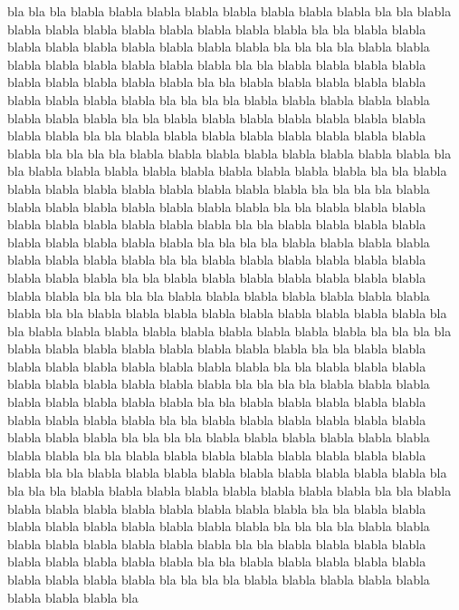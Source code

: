 \documentclass[12pt,a4paper,english]{book}
\begin{document}
bla bla
bla blabla blabla blabla blabla blabla blabla blabla blabla bla
bla blabla blabla blabla blabla blabla blabla blabla blabla blabla bla
bla blabla blabla blabla blabla blabla blabla blabla blabla blabla bla
bla bla
bla blabla blabla blabla blabla blabla blabla blabla blabla bla
bla blabla blabla blabla blabla blabla blabla blabla blabla blabla bla
bla blabla blabla blabla blabla blabla blabla blabla blabla blabla bla
bla bla
bla blabla blabla blabla blabla blabla blabla blabla blabla bla
bla blabla blabla blabla blabla blabla blabla blabla blabla blabla bla
bla blabla blabla blabla blabla blabla blabla blabla blabla blabla bla
bla bla
bla blabla blabla blabla blabla blabla blabla blabla blabla bla
bla blabla blabla blabla blabla blabla blabla blabla blabla blabla bla
bla blabla blabla blabla blabla blabla blabla blabla blabla blabla bla
bla bla
bla blabla blabla blabla blabla blabla blabla blabla blabla bla
bla blabla blabla blabla blabla blabla blabla blabla blabla blabla bla
bla blabla blabla blabla blabla blabla blabla blabla blabla blabla bla
bla bla
bla blabla blabla blabla blabla blabla blabla blabla blabla bla
bla blabla blabla blabla blabla blabla blabla blabla blabla blabla bla
bla blabla blabla blabla blabla blabla blabla blabla blabla blabla bla
bla bla
bla blabla blabla blabla blabla blabla blabla blabla blabla bla
bla blabla blabla blabla blabla blabla blabla blabla blabla blabla bla
bla blabla blabla blabla blabla blabla blabla blabla blabla blabla bla
bla bla
bla blabla blabla blabla blabla blabla blabla blabla blabla bla
bla blabla blabla blabla blabla blabla blabla blabla blabla blabla bla
bla blabla blabla blabla blabla blabla blabla blabla blabla blabla bla
bla bla
bla blabla blabla blabla blabla blabla blabla blabla blabla bla
bla blabla blabla blabla blabla blabla blabla blabla blabla blabla bla
bla blabla blabla blabla blabla blabla blabla blabla blabla blabla bla
bla bla
bla blabla blabla blabla blabla blabla blabla blabla blabla bla
bla blabla blabla blabla blabla blabla blabla blabla blabla blabla bla
bla blabla blabla blabla blabla blabla blabla blabla blabla blabla bla
bla bla
bla blabla blabla blabla blabla blabla blabla blabla blabla bla
bla blabla blabla blabla blabla blabla blabla blabla blabla blabla bla
bla blabla blabla blabla blabla blabla blabla blabla blabla blabla bla
bla bla
bla blabla blabla blabla blabla blabla blabla blabla blabla bla
bla blabla blabla blabla blabla blabla blabla blabla blabla blabla bla
bla blabla blabla blabla blabla blabla blabla blabla blabla blabla bla
bla bla
bla blabla blabla blabla blabla blabla blabla blabla blabla bla
\end{document}
